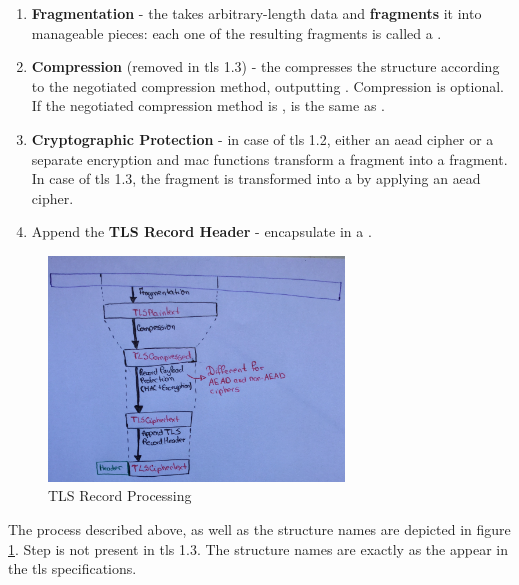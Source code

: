 \documentclass{llncs}
\begin{document}
\begin{enumerate}
  \item \textbf{Fragmentation} - the  takes arbitrary-length data and \textbf{fragments}
  it into manageable pieces: each one of the resulting fragments is called a .
  \item  \textbf{Compression} (removed in \gls{tls} 1.3) - the  compresses the
   structure according to the negotiated compression method,
  outputting . Compression is optional. If the negotiated compression
  method is ,  is the same as .
  \item \textbf{Cryptographic Protection} - in case of \gls{tls} 1.2, either an
  \gls{aead} cipher or a separate encryption and \gls{mac} functions transform a
   fragment into a  fragment. In case
  of \gls{tls} 1.3, the  fragment is transformed into a 
  by applying an \gls{aead} cipher.
  \item Append the \textbf{TLS Record Header} - encapsulate 
  in a .
\end{enumerate}

\begin{figure}
\centering
\includegraphics[width=0.7\textwidth]{img/tls-record-processing.jpg}
\caption{\label{fig:tls-record-processing}TLS Record Processing}
\end{figure}

The process described above, as well as the structure names are depicted in figure \ref{fig:tls-record-processing}.
Step  is not present in \gls{tls} 1.3. The structure names are exactly as the appear in the \gls{tls} specifications.
\end{document}
